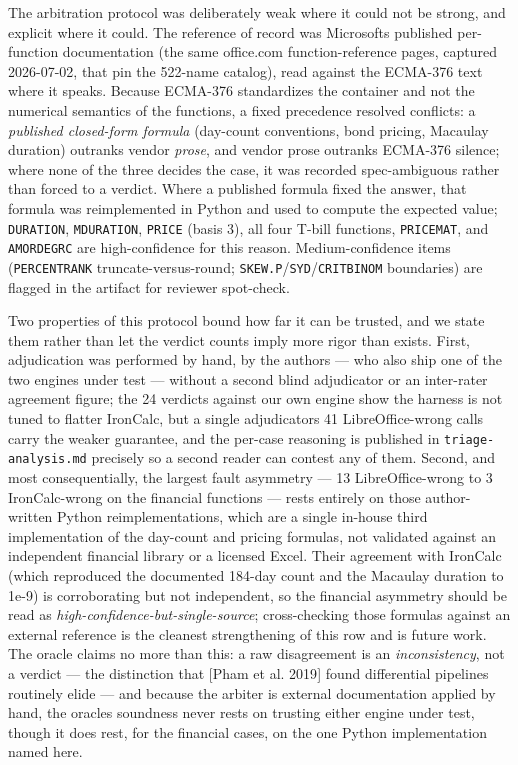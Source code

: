 \documentclass[
]{article}
\newcounter{none} %
\begin{document}
The arbitration protocol was deliberately weak where it could not be
strong, and explicit where it could. The reference of record was
Microsoft\textquotesingle s published per-function documentation (the
same office.com function-reference pages, captured 2026-07-02, that pin
the 522-name catalog), read against the ECMA-376 text where it speaks.
Because ECMA-376 standardizes the container and not the numerical
semantics of the functions, a fixed precedence resolved conflicts: a
\emph{published closed-form formula} (day-count conventions, bond
pricing, Macaulay duration) outranks vendor \emph{prose}, and vendor
prose outranks ECMA-376 silence; where none of the three decides the
case, it was recorded spec-ambiguous rather than forced to a verdict.
Where a published formula fixed the answer, that formula was
reimplemented in Python and used to compute the expected value;
\texttt{DURATION}, \texttt{MDURATION}, \texttt{PRICE} (basis 3), all
four T-bill functions, \texttt{PRICEMAT}, and \texttt{AMORDEGRC} are
high-confidence for this reason. Medium-confidence items
(\texttt{PERCENTRANK} truncate-versus-round;
\texttt{SKEW.P}/\texttt{SYD}/\texttt{CRITBINOM} boundaries) are flagged
in the artifact for reviewer spot-check.

Two properties of this protocol bound how far it can be trusted, and we
state them rather than let the verdict counts imply more rigor than
exists. First, adjudication was performed by hand, by the authors ---
who also ship one of the two engines under test --- without a second
blind adjudicator or an inter-rater agreement figure; the 24 verdicts
against our own engine show the harness is not tuned to flatter
IronCalc, but a single adjudicator\textquotesingle s 41
LibreOffice-wrong calls carry the weaker guarantee, and the per-case
reasoning is published in \texttt{triage-analysis.md} precisely so a
second reader can contest any of them. Second, and most consequentially,
the largest fault asymmetry --- 13 LibreOffice-wrong to 3 IronCalc-wrong
on the financial functions --- rests entirely on those author-written
Python reimplementations, which are a single in-house third
implementation of the day-count and pricing formulas, not validated
against an independent financial library or a licensed Excel. Their
agreement with IronCalc (which reproduced the documented 184-day count
and the Macaulay duration to 1e-9) is corroborating but not independent,
so the financial asymmetry should be read as
\emph{high-confidence-but-single-source}; cross-checking those formulas
against an external reference is the cleanest strengthening of this row
and is future work. The oracle claims no more than this: a raw
disagreement is an \emph{inconsistency}, not a verdict --- the
distinction that {[}Pham et al. 2019{]} found differential pipelines
routinely elide --- and because the arbiter is external documentation
applied by hand, the oracle\textquotesingle s soundness never rests on
trusting either engine under test, though it does rest, for the
financial cases, on the one Python implementation named here.
\end{document}
